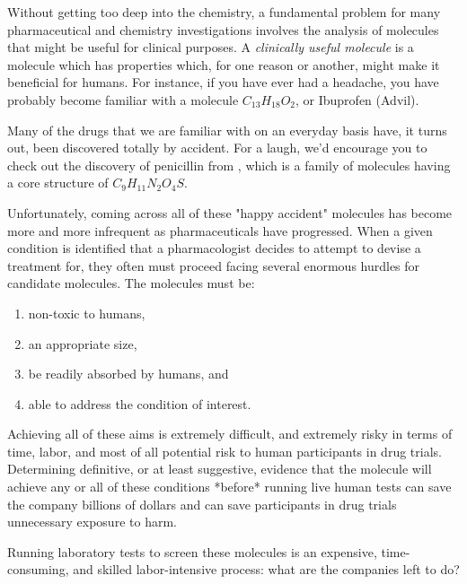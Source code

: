 Without getting too deep into the chemistry, a fundamental problem for many pharmaceutical and chemistry investigations involves the analysis of molecules that might be useful for clinical purposes. A \textit{clinically useful molecule} is a molecule which has properties which, for one reason or another, might make it beneficial for humans. For instance, if you have ever had a headache, you have probably become familiar with a molecule $C_{13}H_{18}O_2$, or Ibuprofen (Advil).

Many of the drugs that we are familiar with on an everyday basis have, it turns out, been discovered totally by accident. For a laugh, we'd encourage you to check out the discovery of penicillin from \cite{ContributorstoWikimediaprojects2023Jan}, which is a family of molecules having a core structure of $C_9H_{11}N_2O_4S$. 

Unfortunately, coming across all of these "happy accident" molecules has become more and more infrequent as pharmaceuticals have progressed. When a given condition is identified that a pharmacologist decides to attempt to devise a treatment for, they often must proceed facing several enormous hurdles for candidate molecules. The molecules must be:
\begin{enumerate}
\item non-toxic to humans,
\item an appropriate size,
\item be readily absorbed by humans, and
\item able to address the condition of interest.
\end{enumerate}

Achieving all of these aims is extremely difficult, and extremely risky in terms of time, labor, and most of all potential risk to human participants in drug trials. Determining definitive, or at least suggestive, evidence that the molecule will achieve any or all of these conditions *before* running live human tests can save the company billions of dollars and can save participants in drug trials unnecessary exposure to harm.

Running laboratory tests to screen these molecules is an expensive, time-consuming, and skilled labor-intensive process: what are the companies left to do?

